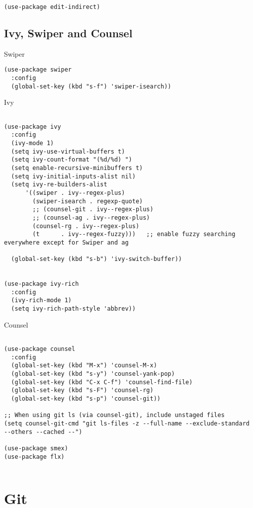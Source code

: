 \documentclass[11pt]{article}
\begin{document}
\begin{verbatim}
(use-package edit-indirect)
\end{verbatim}

\subsection{Ivy, Swiper and Counsel}
\label{sec:org0c3ec85}

Swiper

\begin{verbatim}
(use-package swiper
  :config
  (global-set-key (kbd "s-f") 'swiper-isearch))
\end{verbatim}

Ivy

\begin{verbatim}

(use-package ivy
  :config
  (ivy-mode 1)
  (setq ivy-use-virtual-buffers t)
  (setq ivy-count-format "(%d/%d) ")
  (setq enable-recursive-minibuffers t)
  (setq ivy-initial-inputs-alist nil)
  (setq ivy-re-builders-alist
      '((swiper . ivy--regex-plus)
        (swiper-isearch . regexp-quote)
        ;; (counsel-git . ivy--regex-plus)
        ;; (counsel-ag . ivy--regex-plus)
        (counsel-rg . ivy--regex-plus)
        (t      . ivy--regex-fuzzy)))   ;; enable fuzzy searching everywhere except for Swiper and ag

  (global-set-key (kbd "s-b") 'ivy-switch-buffer))


(use-package ivy-rich
  :config
  (ivy-rich-mode 1)
  (setq ivy-rich-path-style 'abbrev))

\end{verbatim}

Counsel

\begin{verbatim}

(use-package counsel
  :config
  (global-set-key (kbd "M-x") 'counsel-M-x)
  (global-set-key (kbd "s-y") 'counsel-yank-pop)
  (global-set-key (kbd "C-x C-f") 'counsel-find-file)
  (global-set-key (kbd "s-F") 'counsel-rg)
  (global-set-key (kbd "s-p") 'counsel-git))

;; When using git ls (via counsel-git), include unstaged files
(setq counsel-git-cmd "git ls-files -z --full-name --exclude-standard --others --cached --")

(use-package smex)
(use-package flx)


\end{verbatim}
\section{Git}
\label{sec:org155b8a4}
\end{document}
